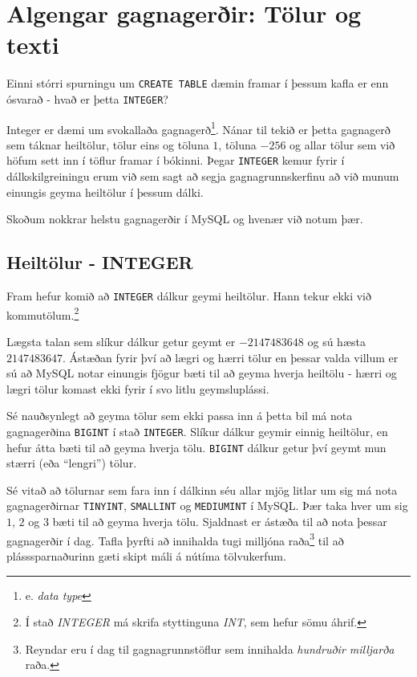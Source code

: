 \section{Algengar gagnagerðir: Tölur og texti} %
\label{undirkafli:gagnagerdir}
Einni stórri spurningu um \verb|CREATE TABLE| dæmin framar í þessum kafla er enn ósvarað - hvað er þetta \verb|INTEGER|?

Integer er dæmi um svokallaða gagnagerð\footnote{e. \emph{data type}}. Nánar til tekið er þetta gagnagerð sem táknar heiltölur, tölur eins og töluna $1$, töluna $-256$ og allar tölur sem við höfum sett inn í töflur framar í bókinni. Þegar \verb|INTEGER| kemur fyrir í dálkskilgreiningu erum við sem sagt að segja gagnagrunnskerfinu að við munum einungis geyma heiltölur í þessum dálki.

Skoðum nokkrar helstu gagnagerðir í MySQL og hvenær við notum þær.
\subsection{Heiltölur - INTEGER}
Fram hefur komið að \verb|INTEGER| dálkur geymi heiltölur. Hann tekur ekki við kommutölum.\footnote{Í stað \emph{INTEGER} má skrifa styttinguna \emph{INT}, sem hefur sömu áhrif.}

Lægsta talan sem slíkur dálkur getur geymt er $-2147483648$ og sú hæsta $2147483647$. Ástæðan fyrir því að lægri og hærri tölur en þessar valda villum er sú að MySQL notar einungis fjögur bæti til að geyma hverja heiltölu - hærri og lægri tölur komast ekki fyrir í svo litlu geymsluplássi.

Sé nauðsynlegt að geyma tölur sem ekki passa inn á þetta bil má nota gagnagerðina \verb|BIGINT| í stað \verb|INTEGER|. Slíkur dálkur geymir einnig heiltölur, en hefur átta bæti til að geyma hverja tölu. \verb|BIGINT| dálkur getur því geymt mun stærri (eða ``lengri'') tölur.

Sé vitað að tölurnar sem fara inn í dálkinn séu allar mjög litlar um sig má nota gagnagerðirnar \verb|TINYINT|, \verb|SMALLINT| og \verb|MEDIUMINT| í MySQL. Þær taka hver um sig $1$, $2$ og $3$ bæti til að geyma hverja tölu. Sjaldnast er ástæða til að nota þessar gagnagerðir í dag. Tafla þyrfti að innihalda tugi milljóna raða\footnote{Reyndar eru í dag til gagnagrunnstöflur sem innihalda \emph{hundruðir milljarða} raða.} til að plásssparnaðurinn gæti skipt máli á nútíma tölvukerfum.

